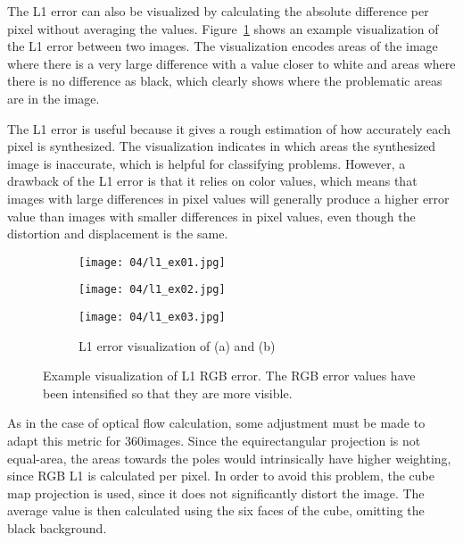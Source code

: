 The L1 error can also be visualized by calculating the absolute difference per pixel without averaging the values. Figure~\ref{fig:l1_example} shows an example visualization of the L1 error between two images. The visualization encodes areas of the image where there is a very large difference with a value closer to white and areas where there is no difference as black, which clearly shows where the problematic areas are in the image.

The L1 error is useful because it gives a rough estimation of how accurately each pixel is synthesized. The visualization indicates in which areas the synthesized image is inaccurate, which is helpful for classifying problems. However, a drawback of the L1 error is that it relies on color values, which means that images with large differences in pixel values will generally produce a higher error value than images with smaller differences in pixel values, even though the distortion and displacement is the same. 

\begin{figure}
\centering
    \hfill
    \begin{subfigure}[t]{0.3\textwidth}
            \centering
            \texttt{[image: 04/l1\_ex01.jpg]}
            \caption{}
    \end{subfigure}%
    \hfill
    \begin{subfigure}[t]{0.3\textwidth}
            \centering
            \texttt{[image: 04/l1\_ex02.jpg]}
            \caption{}
    \end{subfigure}
    \hfill
    \begin{subfigure}[t]{0.3\textwidth}
            \centering
            \texttt{[image: 04/l1\_ex03.jpg]}
            \caption{L1 error visualization of (a) and (b)}
    \end{subfigure}%
    \hfill
    \hfill
  \caption[Example visualization of L1 RGB error]{Example visualization of L1 RGB error. The RGB error values have been intensified so that they are more visible.} \label{fig:l1_example}
\end{figure}

As in the case of optical flow calculation, some adjustment must be made to adapt this metric for 360\degree images. Since the equirectangular projection is not equal-area, the areas towards the poles would intrinsically have higher weighting, since RGB L1 is calculated per pixel. In order to avoid this problem, the cube map projection is used, since it does not significantly distort the image. The average value is then calculated using the six faces of the cube, omitting the black background.

